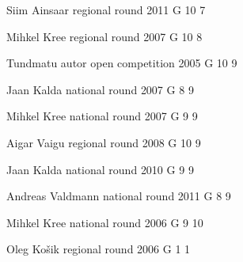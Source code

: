 \documentclass[11pt]{article}
\begin{document}
\ylDisplay{} %
{Siim Ainsaar} %
{regional round} %
{2011} %
{G 10} %
{7} %
{

\ifEngSolution
\fi
}

\ylDisplay{} %
{Mihkel Kree} %
{regional round} %
{2007} %
{G 10} %
{8} %
{

\ifEngSolution
\fi
}

\ylDisplay{} %
{Tundmatu autor} %
{open competition} %
{2005} %
{G 10} %
{9} %
{

\ifEngSolution
\fi
}

\ylDisplay{} %
{Jaan Kalda} %
{national round} %
{2007} %
{G 8} %
{9} %
{

\ifEngSolution
\fi
}

\ylDisplay{} %
{Mihkel Kree} %
{national round} %
{2007} %
{G 9} %
{9} %
{

\ifEngSolution
\fi
}

\ylDisplay{} %
{Aigar Vaigu} %
{regional round} %
{2008} %
{G 10} %
{9} %
{

\ifEngSolution
\fi
}

\ylDisplay{} %
{Jaan Kalda} %
{national round} %
{2010} %
{G 9} %
{9} %
{

\ifEngSolution
\fi
}

\ylDisplay{} %
{Andreas Valdmann} %
{national round} %
{2011} %
{G 8} %
{9} %
{

\ifEngSolution
\fi
}

\ylDisplay{} %
{Mihkel Kree} %
{national round} %
{2006} %
{G 9} %
{10} %
{

\ifEngSolution
\fi
}

\ylDisplay{} %
{Oleg Košik} %
{regional round} %
{2006} %
{G 1} %
{1} %
{

\ifEngSolution
\fi
}
\end{document}
